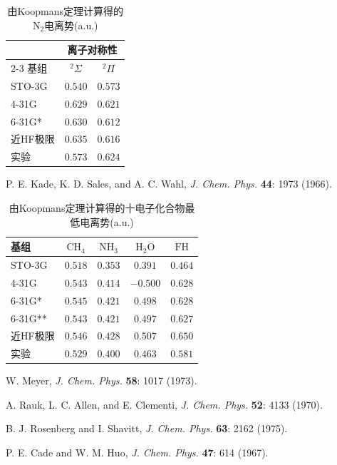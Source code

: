 \begin{table}\centering
	\caption{由Koopmans定理计算得的$\mathrm{N_2}$电离势(a.u.)}
	\begin{threeparttable}
		\begin{tabular}{l@{\hspace{1.5cm}}c@{\hspace{1.5cm}}c}
			\hline & \multicolumn{2}{c}{离子对称性} \\
			\cline{2-3}
			基组 & $^2\Sigma$ & $^2\Pi$ \\
			\hline STO-3G & $0.540$ & $0.573$ \\
			4-31G & $0.629$ & $0.621$ \\
			6-31G* & $0.630$ & $0.612$ \\
			近HF极限\tnote{a} & $0.635$ & $0.616$ \\
			实验 & $0.573$ & $0.624$ \\
			\hline
		\end{tabular}
		\begin{tablenotes}
			\item[a] P. E. Kade, K. D. Sales, and A. C. Wahl, \textit{J. Chem. Phys.} \textbf{44}: 1973 (1966).
		\end{tablenotes}
	\end{threeparttable}
	\label{tab:3.16}
\end{table}

\begin{table}\centering
	\caption{由Koopmans定理计算得的十电子化合物最低电离势(a.u.)}
	\begin{threeparttable}
		\begin{tabular}{lcccc}
			\hline 基组 & $\mathrm{CH}_4$ & $\mathrm{NH}_3$ & $\mathrm{H}_2 \mathrm{O}$ & $\mathrm{FH}$ \\
			\hline STO-3G & $0.518$ & $0.353$ & $0.391$ & $0.464$ \\
			4-31G & $0.543$ & $0.414$ & $-0.500$ & $0.628$ \\
			6-31G* & $0.545$ & $0.421$ & $0.498$ & $0.628$ \\
			6-31G** & $0.543$ & $0.421$ & $0.497$ & $0.627$ \\
			近HF极限 & $0.546$\tnote{a} & $0.428$\tnote{b}
				 & $0.507$\tnote{c} & $0.650$\tnote{d} \\
			实验 & $0.529$ & $0.400$ & $0.463$ & $0.581$ \\
			\hline
		\end{tabular}
		\begin{tablenotes}
			\item[a] W. Meyer, \textit{J. Chem. Phys.} \textbf{58}: 1017 (1973).
			\item[b] A. Rauk, L. C. Allen, and E. Clementi, \textit{J. Chem. Phys.} \textbf{52}: 4133 (1970).
			\item[c] B. J. Rosenberg and I. Shavitt, \textit{J. Chem. Phys.} \textbf{63}: 2162 (1975).
			\item[d] P. E. Cade and W. M. Huo, \textit{J. Chem. Phys.} \textbf{47}: 614 (1967).
		\end{tablenotes}
	\end{threeparttable}
	\label{tab:3.17}
\end{table}

